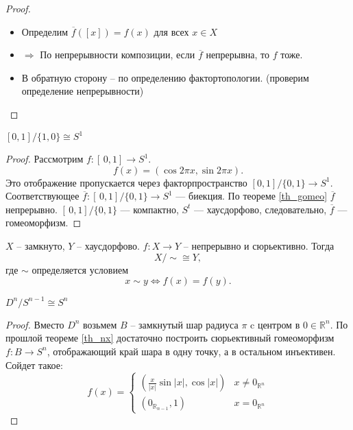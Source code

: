 \documentclass[11pt]{book}
\newcommand{\R}{\mathbb{R}}
\theoremstyle{definition}
\theoremstyle{plain}
\theoremstyle{plain}
\theoremstyle{definition}
\theoremstyle{remark}
\begin{document}
\begin{proof}
    $ $
    \begin{itemize}
	\item Определим $ \overline{f}([x]) = f(x)$ для всех $ x \in X$
	\item $ \boxed{ \Longrightarrow }$ По непрерывности композиции, если $ \overline{f}$ непрерывна, то $ f$ тоже.
	\item \boxed{ \Longleftarrow } В обратную сторону -- по определению фактортопологии. (проверим определение непрерывности)
    \end{itemize}
\end{proof}
\begin{thm}
    $ [0, 1] / \{1, 0\} \cong S^{1}$
\end{thm}
\begin{proof}
    Рассмотрим $ f: [\,0,1] \to  S^{1}$.
    \[
	f(x) = (\cos 2\pi x, \sin 2 \pi x)
    .\]
    Это отображение пропускается через факторпространство $ [0, 1]/\{0, 1\} \to  S^{1}$.
    Соответствующее $ \overline{f}: [\,0, 1] /\{0, 1\} \to  S^{1}$ --- биекция. По теореме \ref{th_gomeo} $ \overline{f}$ непрерывно.
    $ [\,0, 1]/\{0, 1\}$ --- компактно, $ S^{t}$ --- хаусдорфово, следовательно, $ \overline{f}$ --- гомеоморфизм.
\end{proof}
\begin{thm}\label{th_nx}
    $ X$ -- замкнуто, $ Y$ -- хаусдорфово.
    $ f : X \to  Y $ -- непрерывно и сюрьективно.
    Тогда $$X /\! \sim  \cong  Y
    ,$$
    где $ \sim $ определяется условием \[
	x \sim y \Longleftrightarrow f(x) = f(y)
    .\]
\end{thm}
\begin{thm}\label{proof_dn_sn}
    $ D^{n} / S^{n-1} \cong S^{n}$
\end{thm}
\begin{proof}
    Вместо $ D^{n}$ возьмем $ B$ -- замкнутый шар радиуса $ \pi$ c  центром в $ 0 \in \R^{n} $.
    По прошлой теореме \ref{th_nx} достаточно построить сюрьективный гомеоморфизм $ f: B \to  S ^{n}$, отображающий край шара в одну точку, а в остальном инъективен.
    Сойдет такое:
    \[
	f(x) =
	\begin{cases}
	    \left( \frac{x}{|x|} \sin|x|, \cos |x| \right) & x \ne  0_{\R^{n}} \\
	    (0_{\R_{n-1}}, 1) & x = 0_{\R^{n}}
	\end{cases}
    \]
\end{proof}
\end{document}
